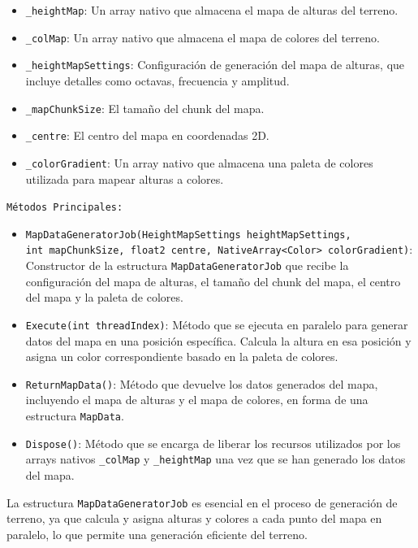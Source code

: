 \begin{enumerate}
    \begin{itemize}
        \item \texttt{\_heightMap}: Un array nativo que almacena el mapa de alturas del terreno.
        \item \texttt{\_colMap}: Un array nativo que almacena el mapa de colores del terreno.
        \item \texttt{\_heightMapSettings}: Configuración de generación del mapa de alturas, que incluye detalles como octavas, frecuencia y amplitud.
        \item \texttt{\_mapChunkSize}: El tamaño del chunk del mapa.
        \item \texttt{\_centre}: El centro del mapa en coordenadas 2D.
        \item \texttt{\_colorGradient}: Un array nativo que almacena una paleta de colores utilizada para mapear alturas a colores.
    \end{itemize}

    \texttt{Métodos Principales:}

    \begin{itemize}
        \item \texttt{MapDataGeneratorJob(HeightMapSettings heightMapSettings, \\int mapChunkSize, float2 centre, NativeArray<Color> colorGradient)}: Constructor de la estructura \texttt{MapDataGeneratorJob} que recibe la configuración del mapa de alturas, el tamaño del chunk del mapa, el centro del mapa y la paleta de colores.

        \item \texttt{Execute(int threadIndex)}: Método que se ejecuta en paralelo para generar datos del mapa en una posición específica. Calcula la altura en esa posición y asigna un color correspondiente basado en la paleta de colores.

        \item \texttt{ReturnMapData()}: Método que devuelve los datos generados del mapa, incluyendo el mapa de alturas y el mapa de colores, en forma de una estructura \texttt{MapData}.

        \item \texttt{Dispose()}: Método que se encarga de liberar los recursos utilizados por los arrays nativos \texttt{\_colMap} y \texttt{\_heightMap} una vez que se han generado los datos del mapa.

    \end{itemize}

    La estructura \texttt{MapDataGeneratorJob} es esencial en el proceso de generación de terreno, ya que calcula y asigna alturas y colores a cada punto del mapa en paralelo, lo que permite una generación eficiente del terreno.\\
    \\


\end{enumerate}
